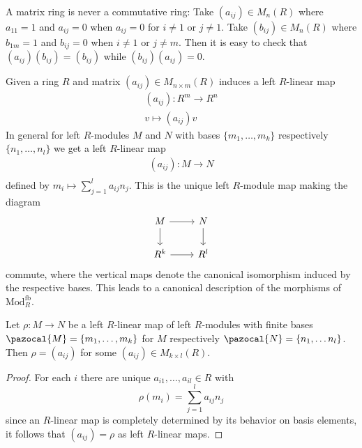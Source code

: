 \begin{example}
    A matrix ring is never a commutative ring: Take $(a_{ij})\in M_n(R)$ where $a_{11}= 1$ and $a_{ij} = 0$ when $a_{ij} =0$ for $i\neq 1$ or $j\neq 1$. Take $(b_{ij})\in M_n(R)$ where $b_{1m} =1$ and $b_{ij}=0$ when $i \neq 1$ or $j \neq m$. Then it is easy to check that $(a_{ij})(b_{ij}) = (b_{ij})$ while $(b_{ij})(a_{ij}) = 0$.
\end{example}
Given a ring $R$ and matrix $(a_{ij})\in M_{n\times m}(R)$ induces a left $R$-linear map 
\begin{gather*}
    (a_{ij}) : R^m\rightarrow R^n\\
    v\mapsto (a_{ij})v
\end{gather*}
In general for left $R$-modules $M$ and $N$ with bases $\{m_1,\dots,m_k\}$ respectively $\{n_1,\dots,n_l\}$ we get a left $R$-linear map
\begin{gather*}
    (a_{ij}) : M\rightarrow N\\
\end{gather*}
defined by $m_i\mapsto \sum_{j=1}^l a_{ij} n_j$. This is the unique left $R$-module map making the diagram 
$$
    \begin{tikzcd}
        M \arrow[d] \arrow[r]& N \arrow[d]\\
        R^k \arrow[r] & R^l
    \end{tikzcd}
$$
commute, where the vertical maps denote the canonical isomorphism induced by the respective bases.
This leads to a canonical description of the morphisms of $\mathrm{Mod}_R^{\mathrm{fb}}$.
\begin{lemma}
    Let $\rho : M\rightarrow N$ be a left $R$-linear map of left $R$-modules with finite bases $\pazocal{M}=\{m_1,\dots,m_k\}$ for $M$ respectively $\pazocal{N}=\{n_1,\dots n_l\}$. Then $\rho = (a_{ij})$ for some $(a_{ij})\in M_{k\times l}(R)$.
\end{lemma}
\begin{proof}
    For each $i$ there are unique $a_{i1},\dots,a_{il}\in R$ with 
    $$
        \rho(m_i) = \sum_{j=1}^l a_{ij}n_j
    $$
    since an $R$-linear map is completely determined by its behavior on basis elements, it follows that $(a_{ij})=\rho$ as left $R$-linear maps. 
\end{proof}

